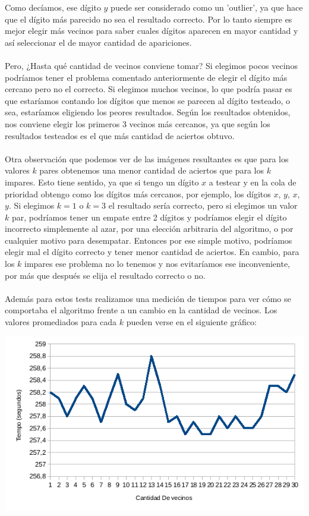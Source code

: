 Como decíamos, ese dígito $y$ puede ser considerado como un 'outlier', ya que hace que el dígito más parecido no sea el resultado correcto. Por lo tanto siempre es mejor elegir más vecinos para saber cuales dígitos aparecen en mayor cantidad y así seleccionar el de mayor cantidad de apariciones.
\\ \\
Pero, ¿Hasta qué cantidad de vecinos conviene tomar?
Si elegimos pocos vecinos podríamos tener el problema comentado anteriormente de elegir el dígito más cercano pero no el correcto.
Si elegimos muchos vecinos, lo que podría pasar es que estaríamos contando los dígitos que menos se parecen al dígito testeado, o sea, estaríamos eligiendo los peores resultados.
Según los resultados obtenidos, nos conviene elegir los primeros 3 vecinos más cercanos, ya que según los resultados testeados es el que más cantidad de aciertos obtuvo.
\\ \\
Otra observación que podemos ver de las imágenes resultantes es que para los valores $k$ pares obtenemos una menor cantidad de aciertos que para los $k$ impares.
Esto tiene sentido, ya que si tengo un dígito $x$ a testear y en la cola de prioridad obtengo como los dígitos más cercanos, por ejemplo, los dígitos $x$, $y$, $x$, $y$.
Si elegimos $k=1$ o $k=3$ el resultado sería correcto, pero si elegimos un valor $k$ par, podríamos tener un empate entre 2 dígitos y podríamos elegir el dígito incorrecto simplemente al azar, por una elección arbitraria del algoritmo, o por cualquier motivo para desempatar. Entonces por ese simple motivo, podríamos elegir mal el dígito correcto y tener menor cantidad de aciertos. En cambio, para los $k$ impares ese problema no lo tenemos y nos evitaríamos ese inconveniente, por más que después se elija el resultado correcto o no.
\\ \\
Además para estos tests realizamos una medición de tiempos para ver cómo se comportaba el algoritmo frente a un cambio en la cantidad de vecinos. Los valores promediados para cada $k$ pueden verse en el siguiente gráfico:

\includegraphics[scale=0.55]{nuevosResultados/knn/knntemp.png}\\

